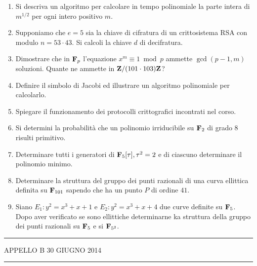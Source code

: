 \documentclass[a4paper,12pt]{article}
\begin{document}
\begin{enumerate}
\item Si descriva un algoritmo per calcolare in tempo polinomiale la parte intera di $m^{1/2}$ per ogni intero positivo $m$.
\item Supponiamo che $e=5$ sia la chiave di cifratura di un crittosistema RSA con modulo $n=53\cdot43$. Si calcoli la chiave $d$ di 
decifratura.
\item Dimostrare che in ${\bf F}_p$ l'equazione $x^m\equiv1\bmod p$ 
          ammette $\gcd(p-1,m)$ soluzioni. Quante ne ammette in ${\bf Z}/(101\cdot 103){\bf Z}$?
\item Definire il simbolo di Jacobi ed illustrare un algoritmo polinomiale per calcolarlo.
\item Spiegare il funzionamento dei protocolli crittografici incontrati nel corso.
\item Si determini la probabilit\`a che un polinomio irriducibile 
          su ${\bf F}_2$ di grado $8$ risulti primitivo.
\item Determinare tutti i generatori di ${\bf F}_{5}[\tau], \tau^2=2$ e di ciascuno determinare il polinomio minimo.
\item Determinare la struttura del gruppo dei punti razionali di una curva ellittica definita su ${\bf F}_{101}$ sapendo che
ha un punto $P$ di ordine $41$.
\item Siano $E_1: y^2=x^3+x+1$ e $E_2: y^2=x^3+x+4$ due curve definite su ${\bf F}_5$. Dopo aver verificato se sono ellittiche determinarne ka struttura della
          gruppo dei punti razionali su ${\bf F}_5$ e si ${\bf F}_{5^2}$.
\end{enumerate}

\hrule\smallskip

\noindent APPELLO B \hfill  30 GIUGNO 2014 

\hrule\smallskip
\end{document}
